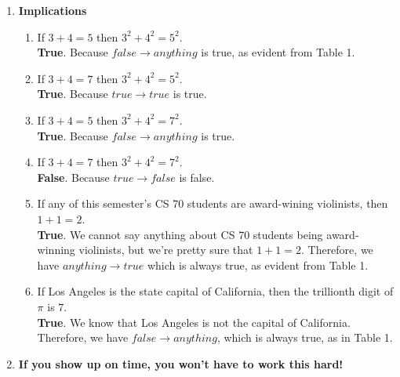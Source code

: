\documentclass[11pt]{article}
\begin{document}
	\begin{enumerate}
		\item \textbf{Implications}
		
		\begin{enumerate}	
			\item If $3 + 4 = 5$ then $3^2 + 4^2 = 5^2$.
			\\
			\textbf{True}. Because $false \rightarrow anything$ is true, as evident from Table 1.  \\
			
			\item If $3 + 4 = 7$ then $3^2 + 4^2 = 5^2$.
			\\
			\textbf{True}. Because $true \rightarrow true$ is true. \\
			
			\item If $3 + 4 = 5$ then $3^2 + 4^2 = 7^2$.
			\\
			\textbf{True}. Because $false \rightarrow anything$ is true.\\
			
			\item If $3 + 4 = 7$ then $3^2 + 4^2 = 7^2$.
			\\
			\textbf{False}. Because $true \rightarrow false$ is false.\\
			
			\item If any of this semester's CS 70 students are award-wining violinists, then $1 + 1 = 2$.
			\\
			\textbf{True}. We cannot say anything about CS 70 students being award-winning violinists, but we're pretty sure that $1 + 1 = 2$. Therefore, we have $anything \rightarrow true$ which is always true, as evident from Table 1.\\
			
			\item If Los Angeles is the state capital of California, then the trillionth digit of $\pi$ is $7$.
			\\ 
			\textbf{True}. We know that Los Angeles is not the capital of California. Therefore, we have $false \rightarrow anything$, which is always true, as in Table 1.\\
			
		\end{enumerate}
		
		\item \textbf{If you show up on time, you won’t have to work this hard!}
		

\end{enumerate}
\end{document}
